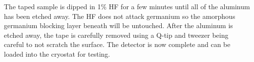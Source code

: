 The taped sample is dipped in 1\% HF for a few minutes until all of the aluminum has been etched away.
The HF does not attack germanium so the amorphous germanium blocking layer beneath will be untouched.
After the aluminum is etched away, the tape is carefully removed using a Q-tip and tweezer being careful to not scratch the surface.
The detector is now complete and can be loaded into the cryostat for testing.

